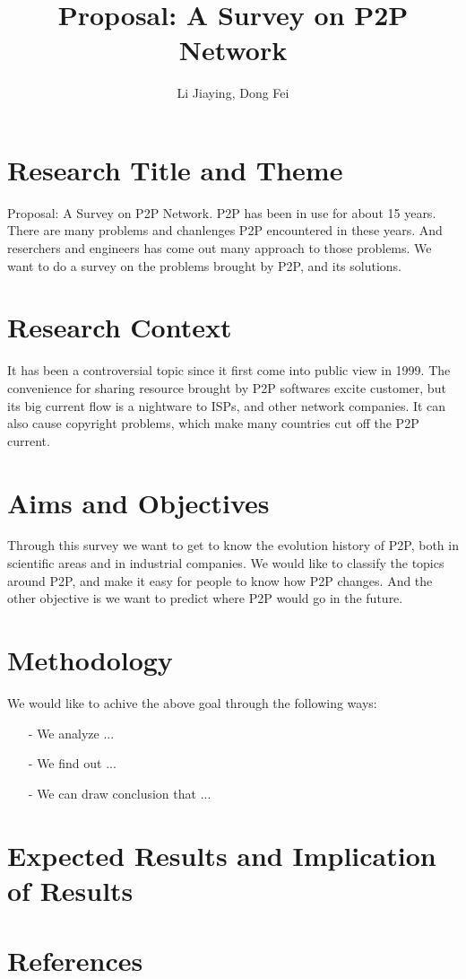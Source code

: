 \documentclass[10pt, a4paper, onecolumn, fleqn]{article}
\begin{document}
\title{Proposal: A Survey on P2P Network}
\author{Li Jiaying, Dong Fei}
\maketitle

\pagestyle{empty}
\section{Research Title and Theme}
Proposal: A Survey on P2P Network.
P2P has been in use for about 15 years.
There are many problems and chanlenges P2P encountered in these years.
And reserchers and engineers has come out many approach to those problems.
We want to do a survey on the problems brought by P2P, and its solutions.


\section{Research Context}
It has been a controversial topic since it first come into public view in 1999.
The convenience for sharing resource brought by P2P softwares excite customer,
but its big current flow is a nightware to ISPs, and other network companies.
It can also cause copyright problems, which make many countries cut off the P2P current.

\section{Aims and Objectives}
Through this survey we want to get to know the evolution history of P2P, both in scientific areas and in industrial companies.
We would like to classify the topics around P2P, and make it easy for people to know how P2P changes.
And the other objective is we want to predict where P2P would go in the future.


\section{Methodology}
We would like to achive the above goal through the following ways: \begin{enumerate}
\item[-]We analyze ...
\item[-]We find out ...
\item[-]We can draw conclusion that ...
\end{enumerate}


\section{Expected Results and Implication of Results}




\section{References}
\end{document}
